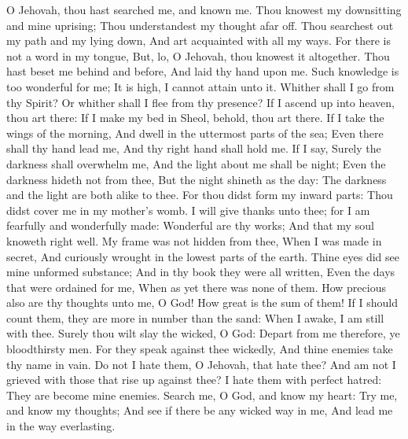 O Jehovah, thou hast searched me, and known me.  Thou knowest my downsitting and mine uprising; Thou understandest my thought afar off.  Thou searchest out my path and my lying down, And art acquainted with all my ways.  For there is not a word in my tongue, But, lo, O Jehovah, thou knowest it altogether.  Thou hast beset me behind and before, And laid thy hand upon me.  Such knowledge is too wonderful for me; It is high, I cannot attain unto it.  Whither shall I go from thy Spirit? Or whither shall I flee from thy presence?  If I ascend up into heaven, thou art there: If I make my bed in Sheol, behold, thou art there.  If I take the wings of the morning, And dwell in the uttermost parts of the sea;  Even there shall thy hand lead me, And thy right hand shall hold me.  If I say, Surely the darkness shall overwhelm me, And the light about me shall be night;  Even the darkness hideth not from thee, But the night shineth as the day: The darkness and the light are both alike to thee.  For thou didst form my inward parts: Thou didst cover me in my mother’s womb.  I will give thanks unto thee; for I am fearfully and wonderfully made: Wonderful are thy works; And that my soul knoweth right well.  My frame was not hidden from thee, When I was made in secret, And curiously wrought in the lowest parts of the earth.  Thine eyes did see mine unformed substance; And in thy book they were all written, Even the days that were ordained for me, When as yet there was none of them.  How precious also are thy thoughts unto me, O God! How great is the sum of them!  If I should count them, they are more in number than the sand: When I awake, I am still with thee.  Surely thou wilt slay the wicked, O God: Depart from me therefore, ye bloodthirsty men.  For they speak against thee wickedly, And thine enemies take thy name in vain.  Do not I hate them, O Jehovah, that hate thee? And am not I grieved with those that rise up against thee?  I hate them with perfect hatred: They are become mine enemies.  Search me, O God, and know my heart: Try me, and know my thoughts;  And see if there be any wicked way in me, And lead me in the way everlasting. 

